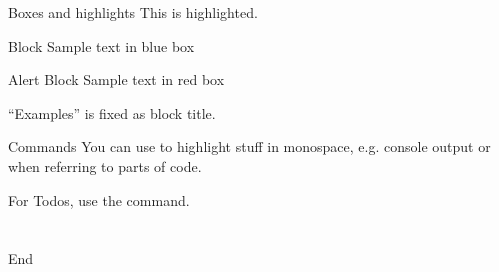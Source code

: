 \begin{frame}{Boxes and highlights}
This is \alert{highlighted}.
\begin{block}{Block}
Sample text in blue box
\end{block}
\begin{alertblock}{Alert Block}
Sample text in red box
\end{alertblock}
\begin{examples}
``Examples'' is fixed as block title.
\end{examples}
\end{frame}

\begin{frame}{Commands}
  You can use  to highlight stuff in monospace, e.g.
  console output or when referring to parts of code.

  For Todos, use the  command.
\end{frame}

\part{} %
\begin{frame}{End}
  \begin{center}
  \end{center}
\end{frame}


\appendix
